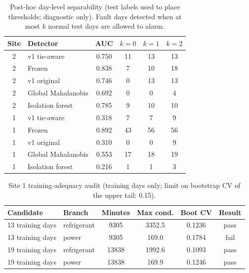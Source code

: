 \begin{table}[h!]\centering\footnotesize\caption{Post-hoc day-level separability (test labels used to place thresholds; diagnostic only). Fault days detected when at most $k$ normal test days are allowed to alarm.}\label{tab:S8}
\begin{tabular}{clcccc}\toprule
Site & Detector & AUC & $k=0$ & $k=1$ & $k=2$\\\midrule
2 & v1 tie-aware & 0.750 & 11 & 13 & 13\\
2 & Frozen & 0.838 & 7 & 10 & 18\\
2 & v1 original & 0.746 & 0 & 13 & 13\\
2 & Global Mahalanobis & 0.692 & 0 & 0 & 4\\
2 & Isolation forest & 0.785 & 9 & 10 & 10\\
1 & v1 tie-aware & 0.318 & 7 & 7 & 9\\
1 & Frozen & 0.892 & 43 & 56 & 56\\
1 & v1 original & 0.310 & 0 & 0 & 9\\
1 & Global Mahalanobis & 0.553 & 17 & 18 & 19\\
1 & Isolation forest & 0.216 & 1 & 1 & 3\\
\bottomrule\end{tabular}\end{table}

\begin{table}[h!]\centering\footnotesize\caption{Site 1 training-adequacy audit (training days only; limit on bootstrap CV of the upper tail: 0.15).}\label{tab:S9}
\begin{tabular}{llcccc}\toprule
Candidate & Branch & Minutes & Max cond. & Boot CV & Result\\\midrule
13 training days & refrigerant & 9305 & 3352.5 & 0.1236 & pass\\
13 training days & power & 9305 & 169.0 & 0.1784 & fail\\
19 training days & refrigerant & 13838 & 1992.6 & 0.1093 & pass\\
19 training days & power & 13838 & 169.9 & 0.1246 & pass\\
\bottomrule\end{tabular}\end{table}

